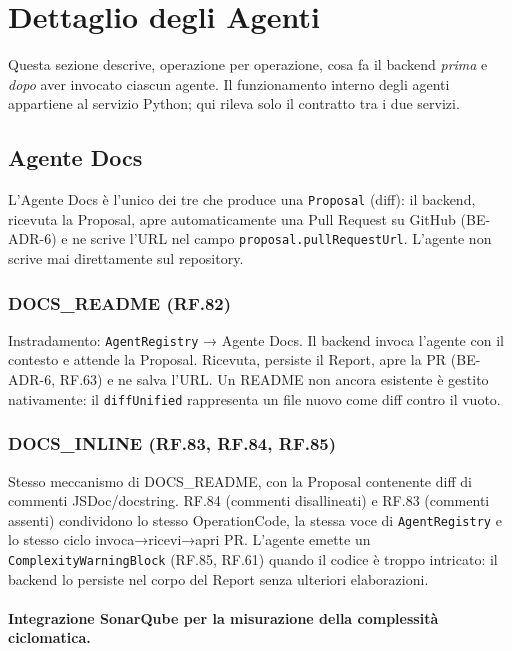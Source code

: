 \documentclass[11pt,a4paper]{article}
\begin{document}
\section{Dettaglio degli Agenti}
\label{sec:be-dettaglio-agenti}

Questa sezione descrive, operazione per operazione, cosa fa il backend \emph{prima} e \emph{dopo} aver invocato ciascun agente. Il funzionamento interno degli agenti appartiene al servizio Python; qui rileva solo il contratto tra i due servizi.

\subsection{Agente Docs}
\label{sec:be-agente-docs}

L'Agente Docs è l'unico dei tre che produce una \texttt{Proposal} (diff): il backend, ricevuta la Proposal, apre automaticamente una Pull Request su GitHub (BE-ADR-6) e ne scrive l'URL nel campo \texttt{proposal.pullRequestUrl}. L'agente non scrive mai direttamente sul repository.

\subsubsection{DOCS\_README (RF.82)}
Instradamento: \texttt{AgentRegistry} → Agente Docs. Il backend invoca l'agente con il contesto e attende la Proposal. Ricevuta, persiste il Report, apre la PR (BE-ADR-6, RF.63) e ne salva l'URL. Un README non ancora esistente è gestito nativamente: il \texttt{diffUnified} rappresenta un file nuovo come diff contro il vuoto.

\subsubsection{DOCS\_INLINE (RF.83, RF.84, RF.85)}
\label{sec:be-docs-inline}

Stesso meccanismo di DOCS\_README, con la Proposal contenente diff di commenti JSDoc/docstring. RF.84 (commenti disallineati) e RF.83 (commenti assenti) condividono lo stesso OperationCode, la stessa voce di \texttt{AgentRegistry} e lo stesso ciclo invoca→ricevi→apri PR. L'agente emette un \texttt{ComplexityWarningBlock} (RF.85, RF.61) quando il codice è troppo intricato: il backend lo persiste nel corpo del Report senza ulteriori elaborazioni.

\paragraph{Integrazione SonarQube per la misurazione della complessità ciclomatica.}
\end{document}
